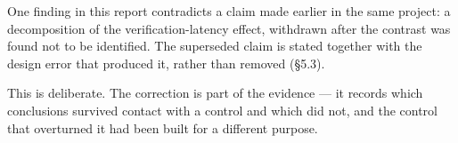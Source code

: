 One finding in this report contradicts a claim made earlier in the same
project: a decomposition of the verification-latency effect, withdrawn
after the contrast was found not to be identified. The superseded claim
is stated together with the design error that produced it, rather than
removed (\S{}5.3).

This is deliberate. The correction is part of the evidence --- it
records which conclusions survived contact with a control and which did
not, and the control that overturned it had been built for a different
purpose.
